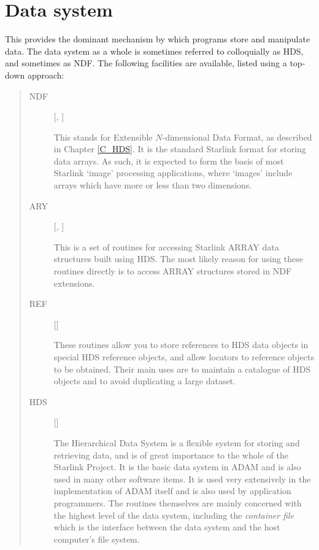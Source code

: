\section{Data system}

This provides the dominant mechanism by which programs store and manipulate
data.
The data system as a whole is sometimes referred to colloquially as HDS, and
sometimes as NDF.
The following facilities are available, listed using a top-down approach:
\begin{quote}
\begin{description}

\item [NDF] \hfill [, ]

 This stands for Extensible $N$-dimensional Data Format, as described 
 in Chapter \ref{C_HDS}.
 It is the standard Starlink format for storing data arrays.
 As such, it is expected to form the basis of most Starlink `image' processing
 applications, where `images' include arrays which have more or less than two
 dimensions.

\item [ARY] \hfill [, ]

 This is a set of routines for accessing Starlink ARRAY data structures built
 using HDS.
 The most likely reason for using these routines directly is to access
 ARRAY structures stored in NDF extensions.

\item [REF] \hfill []
 
 These routines allow you to store references to HDS data objects in special
 HDS reference objects, and allow locators to reference objects to be obtained.
 Their main uses are to maintain a catalogue of HDS objects and to avoid
 duplicating a large dataset.

\item [HDS] \hfill []

 The Hierarchical Data System is a flexible system for storing and retrieving
 data, and is of great importance to the whole of the Starlink Project.
 It is the basic data system in ADAM and is also used in many other software
 items.
 It is used very extensively in the implementation of ADAM itself and is also
 used  by application programmers.
 The routines themselves are mainly concerned with the highest level of the
 data system, including the {\em container file} which is the interface
 between the data system and the host computer's file system.


\end{description}
\end{quote}
